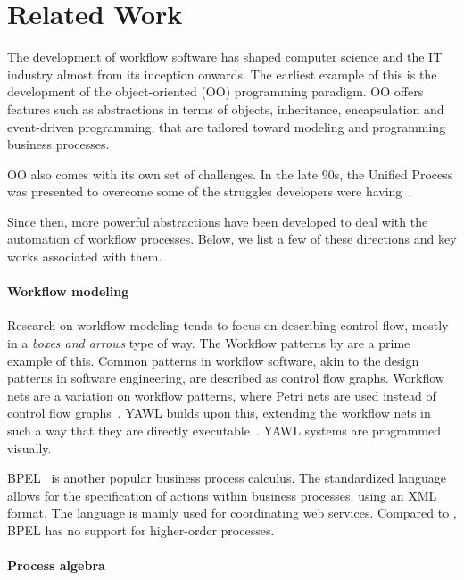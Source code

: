 
\section{Related Work}
\label{sec:relatedwork}

The development of workflow software has shaped computer science and the IT industry almost from its inception onwards.
The earliest example of this is the development of the object-oriented (OO) programming paradigm.
OO offers features such as abstractions in terms of objects, inheritance, encapsulation and event-driven programming, that are tailored toward modeling and programming business processes.

OO also comes with its own set of challenges.
In the late 90s, the Unified Process was presented to overcome some of the struggles developers were having~\cite{DBLP:books/daglib/0000196}.

Since then, more powerful abstractions have been developed to deal with the automation of workflow processes.
Below, we list a few of these directions and key works associated with them.


\paragraph{Workflow modeling}

Research on workflow modeling tends to focus on describing control flow, mostly in a \textit{boxes and arrows} type of way.
The Workflow patterns by \citet{journals/dpd/AalstHKB03} are a prime example of this.
Common patterns in workflow software, akin to the design patterns in software engineering, are described as control flow graphs.
Workflow nets are a variation on workflow patterns, where Petri nets are used instead of control flow graphs~\cite{journals/infsof/LassenA09,journals/jcsc/Aalst98}.
YAWL builds upon this, extending the workflow nets in such a way that they are directly executable~\cite{journals/is/AalstH05}.
YAWL systems are programmed visually.

BPEL~\cite{bpel} is another popular business process calculus.
The standardized language allows for the specification of actions within business processes, using an XML format.
The language is mainly used for coordinating web services.
Compared to \TOPHAT, BPEL has no support for higher-order processes.


\paragraph{Process algebra}

